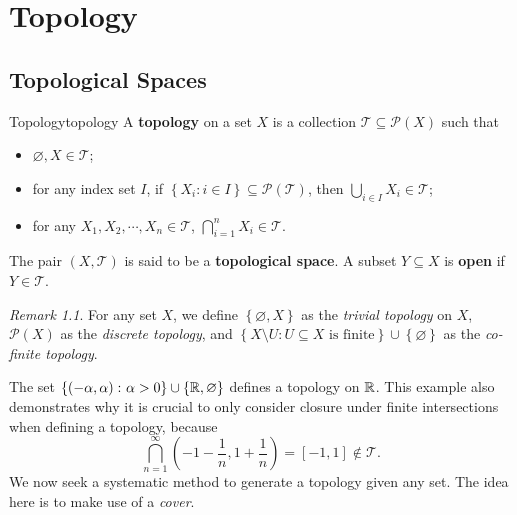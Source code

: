 \documentclass[math]{amznotes}
\theoremstyle{remark}
\newtheorem*{remark}{Remark}
\begin{document}
\tableofcontents
\chapter{Topology}
\section{Topological Spaces}
\begin{dfnbox}{Topology}{topology}
    A {\color{red} \textbf{topology}} on a set $X$ is a collection $\mathcal{T} \subseteq \mathcal{P}\left(X\right)$ such that 
    \begin{itemize}
        \item $\varnothing, X \in \mathcal{T}$;
        \item for any index set $I$, if $\left\{X_i \colon i \in I\right\} \subseteq \mathcal{P}\left(\mathcal{T}\right)$, then $\bigcup_{i \in I}X_i \in \mathcal{T}$;
        \item for any $X_1, X_2, \cdots, X_n \in \mathcal{T}$, $\bigcap_{i = 1}^nX_i \in \mathcal{T}$.
    \end{itemize}
    The pair $\left(X, \mathcal{T}\right)$ is said to be a {\color{red} \textbf{topological space}}. A subset $Y \subseteq X$ is {\color{red} \textbf{open}} if $Y \in \mathcal{T}$.
\end{dfnbox}
\begin{notebox}
    \begin{remark}
        For any set $X$, we define $\left\{\varnothing, X\right\}$ as the \textit{trivial topology} on $X$, $\mathcal{P}\left(X\right)$ as the \textit{discrete topology}, and $\left\{X \setminus U \colon U \subseteq X \textrm{ is finite}\right\} \cup \left\{\varnothing\right\}$ as the \textit{co-finite topology}.
    \end{remark}
\end{notebox}
The set $\left\{\left(-\alpha, \alpha\right) \colon \alpha > 0\right\} \cup \left\{\mathbb{R}, \varnothing\right\}$ defines a topology on $\mathbb{R}$. This example also demonstrates why it is crucial to only consider closure under finite intersections when defining a topology, because
\begin{equation*}
    \bigcap_{n = 1}^{\infty}\left(-1 - \frac{1}{n}, 1 + \frac{1}{n}\right) = [-1, 1] \notin \mathcal{T}.
\end{equation*}
We now seek a systematic method to generate a topology given any set. The idea here is to make use of a \textit{cover}.
\end{document}

